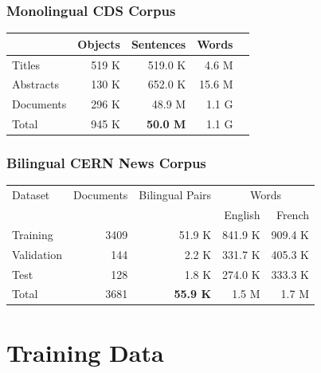 \documentclass[landscape]{article}
\begin{document}
\subsubsection*{Monolingual CDS Corpus}
\begin{table}[!ht]
\centering
\begin{tabular}{l|rrrr}
 						&		Objects		 	&		Sentences					& Words		\\ \hline
Titles 				&		519 K			&		519.0 K 					&	4.6 M		\\
Abstracts			&		130 K			&		652.0 K						&	15.6 M		\\
Documents		&		296 K 			&		48.9 M 						&	1.1 G			\\ \hline
Total					&		945 K			& 		\textbf{50.0 M}			&	1.1 G 		\\

\end{tabular}
\end{table}

\subsubsection*{Bilingual CERN News Corpus}
\begin{table}[!ht]
\centering
\begin{tabular}{l|r|r|r|r}
Dataset			& 	 	Documents	& 	Bilingual Pairs	& 		\multicolumn{2}{c}{Words}	 			\\
					&							&							&			English			&			French			\\	\hline	
Training		&		3409				&				51.9 K	&			841.9 K			&			909.4 K			\\
Validation		&		144 				&				2.2 K		& 			331.7 K			&			405.3 K			\\
Test				&		128 				&				1.8 K		& 			274.0 K			&			333.3 K			\\ \hline
Total				&		3681				&	\textbf{55.9 K}	&			1.5 M			&			1.7 M			\\
\end{tabular}
\end{table}


\cp
\section*{Training Data}
\vspace*{10mm}
\end{document}

